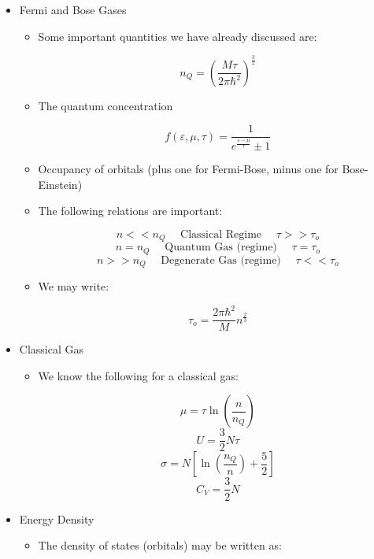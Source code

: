 \begin{itemize}

  \item Fermi and Bose Gases

    \begin{itemize}

      \item Some important quantities we have already discussed are:

        $$n_Q=\left( \frac{M\tau}{2\pi\hbar^2} \right)^{\frac{3}{2}}$$

      \item The quantum concentration

        $$f(\varepsilon,\mu,\tau)=\frac{1}{e^{\frac{\varepsilon-\mu}{\tau}}\pm1}$$

      \item Occupancy of orbitals (plus one for Fermi-Bose, minus one for Bose-Einstein)

      \item The following relations are important:

        $$n<<n_Q\quad\text{ Classical Regime }\quad\tau>>\tau_o$$
        $$n=n_Q\quad\text{ Quantum Gas (regime) }\quad\tau=\tau_o$$
        $$n>>n_Q\quad\text{ Degenerate Gas (regime) }\quad\tau<<\tau_o$$

      \item We may write:

        $$\tau_o=\frac{2\pi\hbar^2}{M}n^{\frac{2}{3}}$$

    \end{itemize}

  \item Classical Gas

    \begin{itemize}

      \item We know the following for a classical gas:

        $$\mu=\tau\ln\left( \frac{n}{n_Q} \right)$$
        $$U=\frac{3}{2}N\tau$$
        $$\sigma=N\left[ \ln\left( \frac{n_Q}{n} \right)+\frac{5}{2} \right]$$
        $$C_V=\frac{3}{2}N$$

    \end{itemize}

  \item Energy Density

    \begin{itemize}

      \item The density of states (orbitals) may be written as:


\end{itemize}
\end{itemize}
